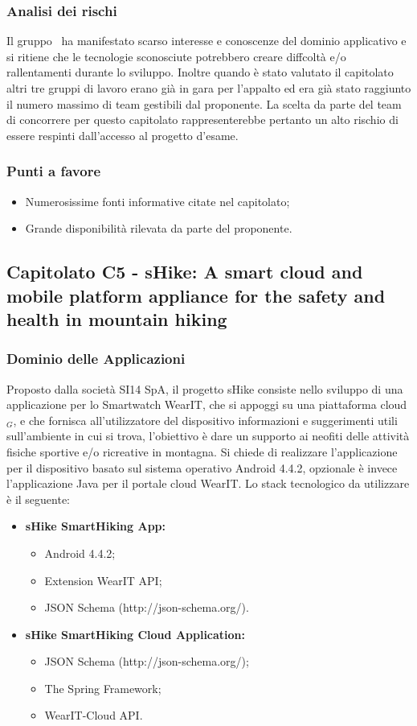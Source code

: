   \subsubsection{Analisi dei rischi}
  Il gruppo \gruppo\ ha manifestato scarso interesse e conoscenze del dominio applicativo e si ritiene che le tecnologie sconosciute 
  potrebbero creare diffcoltà e/o rallentamenti durante lo sviluppo.
  Inoltre quando è stato valutato il capitolato altri tre gruppi di lavoro erano già in gara per l'appalto ed era già stato raggiunto il numero massimo di team gestibili dal proponente. La scelta da parte del team di concorrere per questo capitolato rappresenterebbe pertanto un alto rischio di essere respinti dall'accesso al progetto d'esame.
  \subsubsection{Punti a favore}
  \begin{itemize}
  	\item Numerosissime fonti informative citate nel capitolato;
  	\item Grande disponibilità rilevata da parte del proponente.
  \end{itemize}
\newpage
\subsection{Capitolato C5 - sHike: A smart cloud and mobile platform appliance for the safety and health in mountain hiking}
  \subsubsection{Dominio delle Applicazioni}
  Proposto dalla società SI14 SpA, il progetto sHike consiste nello sviluppo di una applicazione per lo Smartwatch WearIT, che si appoggi su una piattaforma cloud$_G$, e che fornisca all'utilizzatore del dispositivo informazioni e suggerimenti utili sull'ambiente in cui si trova, l'obiettivo è dare un supporto ai neofiti delle attività fisiche sportive e/o ricreative in montagna. Si chiede di realizzare l'applicazione per il dispositivo basato sul sistema operativo Android 4.4.2, opzionale è invece l'applicazione Java per il portale cloud WearIT. Lo stack tecnologico da utilizzare è il seguente:
  \begin{itemize}
  \item \textbf{sHike SmartHiking App:}
     \begin{itemize}
	     \item Android 4.4.2;
	     \item Extension WearIT API;
		 \item JSON Schema (http://json-schema.org/).
     \end{itemize}
  \item \textbf{sHike SmartHiking Cloud Application:}
     \begin{itemize}
       	\item JSON Schema (http://json-schema.org/);
       	\item The Spring Framework;
	    \item WearIT-Cloud API.
     \end{itemize}
  \end{itemize}
